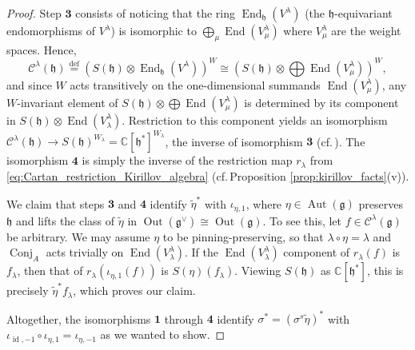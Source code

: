 \documentclass{amsart}
\newcommand{\Aut}{\operatorname{Aut}}
\newcommand{\C}{\mathbb{C}}
\newcommand{\Conj}{\operatorname{Conj}}
\newcommand{\Kir}{\mathcal{C}}
\newcommand{\End}{\operatorname{End}}
\newcommand{\g}{\mathfrak{g}}
\newcommand{\h}{\mathfrak{h}}
\newcommand{\id}{\operatorname{id}}
\newcommand{\Out}{\operatorname{Out}}
\theoremstyle{definition}
\theoremstyle{plain}
\theoremstyle{remark}
\begin{document}
\begin{proof}
    Step $\mathbf{3}$ consists of noticing that the ring $\End_\h(V^\lambda)$ (the $\h$-equivariant endomorphisms of $V^\lambda$) is isomorphic to $\bigoplus_\mu\End(V^\lambda_\mu)$ where $V^\lambda_\mu$ are the weight spaces. Hence,
    $$
        \Kir^\lambda(\h) \overset{\text{def}}{=}
        (S(\h) \otimes \End_\h(V^\lambda))^W
        \cong
        (S(\h) \otimes \bigoplus \End(V^\lambda_\mu))^W,
    $$
    and since $W$ acts transitively on the one-dimensional summands $\End(V^\lambda_\mu)$, any $W$-invariant element of $S(\h) \otimes \bigoplus \End(V^\lambda_\mu)$ is determined by its component in $S(\h) \otimes \End(V^\lambda_\lambda)$. Restriction to this component yields an isomorphism $\Kir^\lambda(\h) \to S(\h)^{W_\lambda} = \C[\h^*]^{W_\lambda}$, the inverse of isomorphism $\mathbf{3}$ (cf.\,\cite[Thm.\,2.6]{Panyushev2004_endoj}). The isomorphism $\mathbf{4}$ is simply the inverse of the restriction map $r_\lambda$ from \eqref{eq:Cartan_restriction_Kirillov_algebra} (cf.\,Proposition \ref{prop:kirillov_facts}(v)). 
    
    We claim that steps $\mathbf{3}$ and $\mathbf{4}$ identify $\widetilde{\eta}^*$ with $\iota_{\eta,1}$, where $\eta\in \Aut(\g)$ preserves $\h$ and lifts the class of $\widetilde{\eta}$ in $\Out(\g^\vee)\cong \Out(\g)$. To see this, let $f\in \Kir^\lambda(\g)$ be arbitrary. We may assume $\eta$ to be pinning-preserving, so that $\lambda\circ \eta = \lambda$ and $\Conj_A$ acts trivially on $\End(V^\lambda_\lambda)$. If the $\End(V^\lambda_\lambda)$ component of $r_\lambda(f)$ is $f_\lambda$, then that of $r_\lambda(\iota_{\eta,1}(f))$ is $S(\eta)(f_\lambda)$. Viewing $S(\h)$ as $\C[\h^*]$, this is precisely $\widetilde{\eta}^*f_\lambda$, which proves our claim. 
    
    Altogether, the isomorphisms $\mathbf{1}$ through $\mathbf{4}$ identify $\sigma^* = (\sigma^s\widetilde{\eta})^*$ with
    $
        \iota_{\id, -1} \circ\iota_{\eta,1}
        =
        \iota_{\eta, -1}
    $
    as we wanted to show.
\end{proof}
\end{document}
